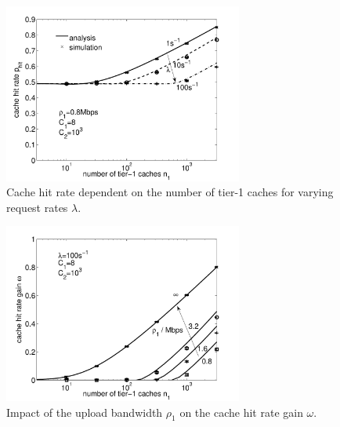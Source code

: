 
\begin{figure}[tb]
  \centering
  \includegraphics[width=0.7\textwidth]{hierarchical/analyticbw/figures/hwc_C8C1e3_l0}
  \caption{Cache hit rate dependent on the number of tier-1 caches for varying request rates $\lambda$.}
  \label{fig:hwc_C8C1e3_l}
\end{figure}

\begin{figure}[tb]
  \centering
  \includegraphics[width=0.7\textwidth]{hierarchical/analyticbw/figures/hwc_C8l100_gain}
  \caption{Impact of the upload bandwidth $\rho_1$ on the cache hit rate gain $\omega$.}
  \label{fig:hwc_C8l100_gain}
\end{figure}

